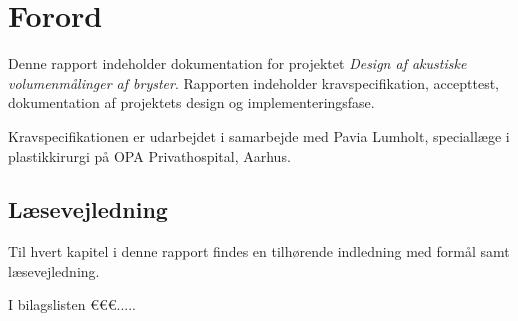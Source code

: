 \chapter*{Forord}

Denne rapport indeholder dokumentation for projektet \textit{Design af akustiske volumenmålinger af bryster}. Rapporten indeholder kravspecifikation, accepttest, dokumentation af projektets design og implementeringsfase. 

Kravspecifikationen er udarbejdet i samarbejde med Pavia Lumholt, speciallæge i plastikkirurgi på OPA Privathospital, Aarhus. 

\section*{Læsevejledning}

Til hvert kapitel i denne rapport findes en tilhørende indledning med formål samt læsevejledning. 

I bilagslisten €€€.....
